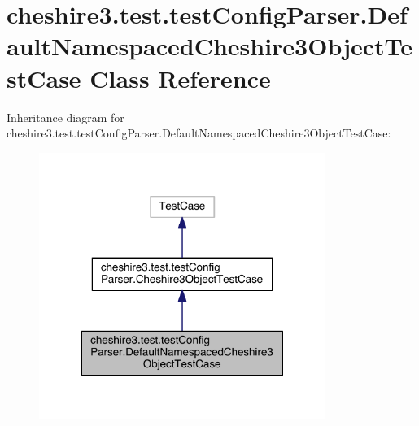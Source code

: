 \hypertarget{classcheshire3_1_1test_1_1test_config_parser_1_1_default_namespaced_cheshire3_object_test_case}{\section{cheshire3.\-test.\-test\-Config\-Parser.\-Default\-Namespaced\-Cheshire3\-Object\-Test\-Case Class Reference}
\label{classcheshire3_1_1test_1_1test_config_parser_1_1_default_namespaced_cheshire3_object_test_case}
}


Inheritance diagram for cheshire3.\-test.\-test\-Config\-Parser.\-Default\-Namespaced\-Cheshire3\-Object\-Test\-Case\-:
\nopagebreak
\begin{figure}[H]
\begin{center}
\leavevmode
\includegraphics[width=264pt]{classcheshire3_1_1test_1_1test_config_parser_1_1_default_namespaced_cheshire3_object_test_case__inherit__graph}
\end{center}
\end{figure}


